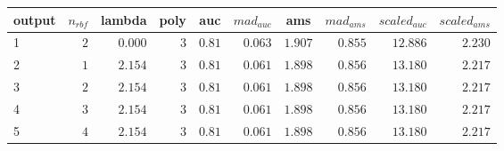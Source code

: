 \begin{table}[!tbp]
\begin{center}
\begin{tabular}{lrrrrrrrrr}
\hline\hline
\multicolumn{1}{l}{output}&\multicolumn{1}{c}{$n_{rbf}$}&\multicolumn{1}{c}{lambda}&\multicolumn{1}{c}{poly}&\multicolumn{1}{c}{auc}&\multicolumn{1}{c}{$mad_{auc}$}&\multicolumn{1}{c}{ams}&\multicolumn{1}{c}{$mad_{ams}$}&\multicolumn{1}{c}{$scaled_{auc}$}&\multicolumn{1}{c}{$scaled_{ams}$}\tabularnewline
\hline
1&$2$&$0.000$&$3$&$0.81$&$0.063$&$1.907$&$0.855$&$12.886$&$2.230$\tabularnewline
2&$1$&$2.154$&$3$&$0.81$&$0.061$&$1.898$&$0.856$&$13.180$&$2.217$\tabularnewline
3&$2$&$2.154$&$3$&$0.81$&$0.061$&$1.898$&$0.856$&$13.180$&$2.217$\tabularnewline
4&$3$&$2.154$&$3$&$0.81$&$0.061$&$1.898$&$0.856$&$13.180$&$2.217$\tabularnewline
5&$4$&$2.154$&$3$&$0.81$&$0.061$&$1.898$&$0.856$&$13.180$&$2.217$\tabularnewline
\hline
\end{tabular}\end{center}
\end{table}
